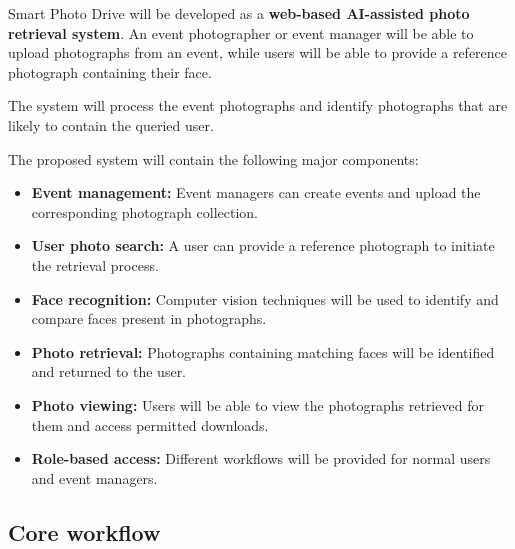 \documentclass[11pt,a4paper]{article}
\begin{document}
Smart Photo Drive will be developed as a \textbf{web-based AI-assisted
photo retrieval system}. An event photographer or event manager will
be able to upload photographs from an event, while users will be able
to provide a reference photograph containing their face.

The system will process the event photographs and identify photographs
that are likely to contain the queried user.

The proposed system will contain the following major components:

\begin{itemize}[leftmargin=0.7cm]

    \item \textbf{Event management:} Event managers can create events
    and upload the corresponding photograph collection.

    \item \textbf{User photo search:} A user can provide a reference
    photograph to initiate the retrieval process.

    \item \textbf{Face recognition:} Computer vision techniques will
    be used to identify and compare faces present in photographs.

    \item \textbf{Photo retrieval:} Photographs containing matching
    faces will be identified and returned to the user.

    \item \textbf{Photo viewing:} Users will be able to view the
    photographs retrieved for them and access permitted downloads.

    \item \textbf{Role-based access:} Different workflows will be
    provided for normal users and event managers.

\end{itemize}

\subsection{Core workflow}
\end{document}
